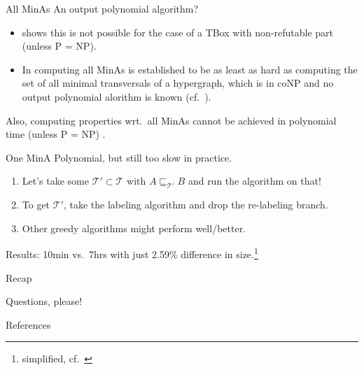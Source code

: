 \documentclass[xcolor={table,usenames,dvipsnames}]{beamer}
\newcommand{\tb}{\ensuremath{\mathcal{T}}\xspace} %
\newcommand{\subsume}{\sqsubseteq}
\begin{document}
\begin{frame}{All MinAs}
An output polynomial algorithm?\\
\begin{itemize}
\item \cite[Thm.~5]{orig2} shows this is \alert{not possible} for the case of a TBox with non-refutable part (unless P = NP).
\item In \cite[Thm.~2]{hard} computing all MinAs is established to be \alert{as least as hard as computing the set of all minimal transversals of a hypergraph}, which is in coNP and no output polynomial alorithm is known (cf.~\cite{hyperai}).
\end{itemize}
Also, computing properties wrt.~all MinAs cannot be achieved in polynomial time (unless P = NP) \cite[Sec.~4]{orig2}.
\end{frame}

\begin{frame}{One MinA}
Polynomial, but still too slow in practice.

\begin{enumerate}
\item Let's take some $\tb' \subset \tb$ with $A \subsume_{\tb'} B$ and run the algorithm on that!
\item To get $\tb'$, take the labeling algorithm and drop the re-labeling branch.
\item Other greedy algorithms might perform well/better.
\end{enumerate}
Results: 10min vs.~7hrs with just 2.59\% difference in size.\footnote{simplified, cf.~\cite[Sec.~5]{orig2}}
\end{frame}

\begin{frame}{Recap}
\tableofcontents
\end{frame}

\begin{frame}[standout]
Questions, please!
\end{frame}

\begin{frame}[allowframebreaks]{References}

{\tiny{ }}
\end{frame}
\end{document}
